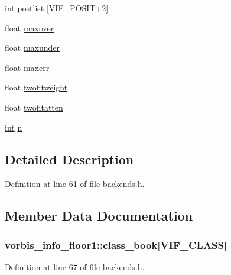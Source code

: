 \begin{DoxyCompactItemize}
\item 
\hyperlink{xmltok_8h_a5a0d4a5641ce434f1d23533f2b2e6653}{int} \hyperlink{structvorbis__info__floor1_a153960a53326cafa537506cb9086156e}{postlist} \mbox{[}\hyperlink{backends_8h_ad98f1819ef37fdc1ed097bf953ed41a9}{V\+I\+F\+\_\+\+P\+O\+S\+IT}+2\mbox{]}
\item 
float \hyperlink{structvorbis__info__floor1_ab582f5329d8755a0241d98b42a686ee4}{maxover}
\item 
float \hyperlink{structvorbis__info__floor1_a910797f6fa710faef66f673ed9752fc7}{maxunder}
\item 
float \hyperlink{structvorbis__info__floor1_a0119a5a0436ab3751c5c51c6e02098f6}{maxerr}
\item 
float \hyperlink{structvorbis__info__floor1_a410ac8aa925af6a6e367b5bb257fcc43}{twofitweight}
\item 
float \hyperlink{structvorbis__info__floor1_a368b3ba743a9ab96206e938ec47102ee}{twofitatten}
\item 
\hyperlink{xmltok_8h_a5a0d4a5641ce434f1d23533f2b2e6653}{int} \hyperlink{structvorbis__info__floor1_a8609b5acccc766282024548fd194e3f6}{n}
\end{DoxyCompactItemize}


\subsection{Detailed Description}


Definition at line 61 of file backends.\+h.



\subsection{Member Data Documentation}
\subsubsection[{\texorpdfstring{class\+\_\+book}{class_book}}]{ vorbis\+\_\+info\+\_\+floor1\+::class\+\_\+book\mbox{[}{\bf V\+I\+F\+\_\+\+C\+L\+A\+SS}\mbox{]}}\hypertarget{structvorbis__info__floor1_a4765de87c6afc7a526684e1f1210556d}{}\label{structvorbis__info__floor1_a4765de87c6afc7a526684e1f1210556d}


Definition at line 67 of file backends.\+h.

